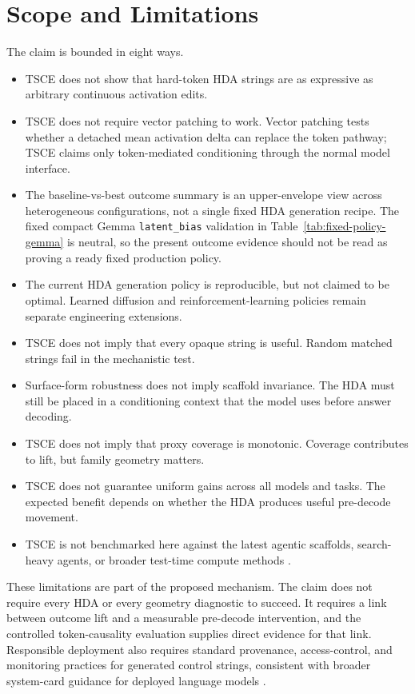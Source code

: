 \documentclass[11pt]{article}
\newcommand{\tsce}{\textsc{TSCE}}
\newcommand{\hda}{\textsc{HDA}}
\begin{document}
\section{Scope and Limitations}

The claim is bounded in eight ways.

\begin{itemize}
    \item \tsce{} does not show that hard-token \hda{} strings are as expressive as arbitrary continuous activation edits.
    \item \tsce{} does not require vector patching to work. Vector patching tests whether a detached mean activation delta can replace the token pathway; \tsce{} claims only token-mediated conditioning through the normal model interface.
    \item The baseline-vs-best outcome summary is an upper-envelope view across heterogeneous configurations, not a single fixed \hda{} generation recipe. The fixed compact Gemma \texttt{latent\_bias} validation in Table~\ref{tab:fixed-policy-gemma} is neutral, so the present outcome evidence should not be read as proving a ready fixed production policy.
    \item The current \hda{} generation policy is reproducible, but not claimed to be optimal. Learned diffusion and reinforcement-learning policies remain separate engineering extensions.
    \item \tsce{} does not imply that every opaque string is useful. Random matched strings fail in the mechanistic test.
    \item Surface-form robustness does not imply scaffold invariance. The \hda{} must still be placed in a conditioning context that the model uses before answer decoding.
    \item \tsce{} does not imply that proxy coverage is monotonic. Coverage contributes to lift, but family geometry matters.
    \item \tsce{} does not guarantee uniform gains across all models and tasks. The expected benefit depends on whether the \hda{} produces useful pre-decode movement.
    \item \tsce{} is not benchmarked here against the latest agentic scaffolds, search-heavy agents, or broader test-time compute methods \cite{self-consistency,self-refine,react}.
\end{itemize}

These limitations are part of the proposed mechanism. The claim does not require every \hda{} or every geometry diagnostic to succeed. It requires a link between outcome lift and a measurable pre-decode intervention, and the controlled token-causality evaluation supplies direct evidence for that link. Responsible deployment also requires standard provenance, access-control, and monitoring practices for generated control strings, consistent with broader system-card guidance for deployed language models \cite{gpt4-system-card}.
\end{document}
